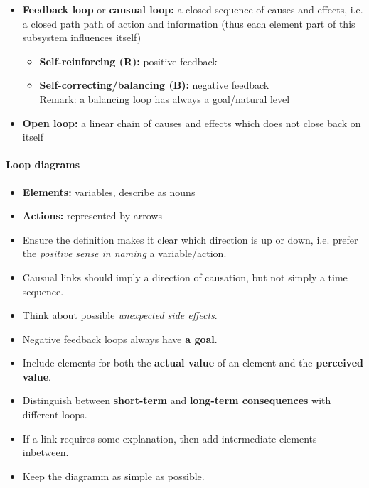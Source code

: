 \documentclass[a4paper, landscape, 6pt, fleqn]{scrartcl}
\renewcommand{\emph}[1]{\textbf{#1}}
\begin{document}
\begin{multicols*}{4}
\begin{itemize}
\item \emph{Feedback loop} or \emph{causual loop:} a closed sequence of causes and effects, i.e. a closed path path of action and information (thus each element part of this subsystem influences itself)
\begin{itemize}
\item \emph{Self-reinforcing (R):} positive feedback
\item \emph{Self-correcting/balancing (B):} negative feedback \\
Remark: a balancing loop has always a goal/natural level
\end{itemize}
\item \emph{Open loop:} a linear chain of causes and effects which does not close back on itself
\end{itemize}

\paragraph{Loop diagrams}

\begin{itemize}
\item \emph{Elements:} variables, describe as nouns
\item \emph{Actions:} represented by arrows
\item Ensure the definition makes it clear which direction is up or down, i.e. prefer the \textit{positive sense in naming} a variable/action.
\item Causual links should imply a direction of causation, but not simply a time sequence.
\item Think about possible \textit{unexpected side effects}.
\item Negative feedback loops always have \emph{a goal}.
\item Include elements for both the \emph{actual value} of an element and the \emph{perceived value}.
\item Distinguish between \emph{short-term} and \emph{long-term consequences} with different loops.
\item If a link requires some explanation, then add intermediate elements inbetween.
\item Keep the diagramm as simple as possible.
\end{itemize}


\end{multicols*}
\end{document}
